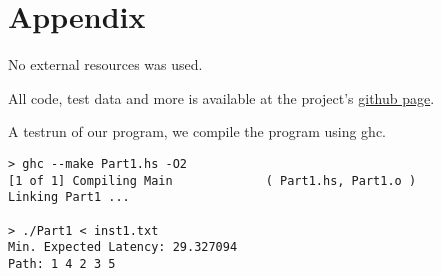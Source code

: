 \documentclass[a4paper,11pt]{article}
\begin{document}
\section{Appendix}
No external resources was used.

All code, test data and more is available at the project's \href{https://github.com/bisforboman/Algorithms-TIN092}{github page}.

A testrun of our program, we compile the program using ghc.

\begin{lstlisting}
> ghc --make Part1.hs -O2
[1 of 1] Compiling Main             ( Part1.hs, Part1.o )
Linking Part1 ...

> ./Part1 < inst1.txt 
Min. Expected Latency: 29.327094
Path: 1 4 2 3 5

\end{lstlisting}
\end{document}
